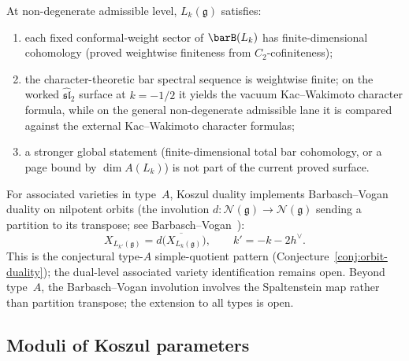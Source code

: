 \begin{conjecture}
\label{conj:koszul-c2-duality}
At non-degenerate admissible level, $L_k(\mathfrak{g})$ satisfies:
\begin{enumerate}[label=\textup{(\alph*)},leftmargin=2em]
\item each fixed conformal-weight sector of $\barB(L_k)$ has
 finite-dimensional cohomology
 \textup{(}proved weightwise finiteness from
 $C_2$-cofiniteness\textup{)};
\item the character-theoretic bar spectral sequence is weightwise
 finite; on the worked $\widehat{\mathfrak{sl}}_2$ surface at
 $k=-1/2$ it yields the vacuum Kac--Wakimoto character formula,
 while on the general non-degenerate admissible lane it is compared
 against the external Kac--Wakimoto character formulas;
\item a stronger global statement \textup{(}finite-dimensional total
 bar cohomology, or a page bound by $\dim A(L_k)$\textup{)} is not
 part of the current proved surface.
\end{enumerate}
For associated varieties in type~$A$, Koszul duality implements
Barbasch--Vogan duality on nilpotent orbits
\textup{(}the involution $d \colon \mathcal{N}(\mathfrak{g})
\to \mathcal{N}(\mathfrak{g})$ sending a partition to its
transpose; see Barbasch--Vogan~\cite{BV85}\textup{)}:
\begin{equation}\label{eq:koszul-bv-duality}
 X_{L_{k'}(\mathfrak{g})} = \overline{d\bigl(X_{L_k(\mathfrak{g})}\bigr)},
 \qquad k' = -k - 2h^\vee.
\end{equation}
This is the conjectural type-$A$ simple-quotient pattern
\textup{(}Conjecture~\textup{\ref{conj:orbit-duality}}\textup{)};
the dual-level associated variety identification remains open.
Beyond type~$A$, the Barbasch--Vogan involution involves the
Spaltenstein map rather than partition transpose; the extension
to all types is open.
\end{conjecture}

\subsection{Moduli of Koszul parameters}

